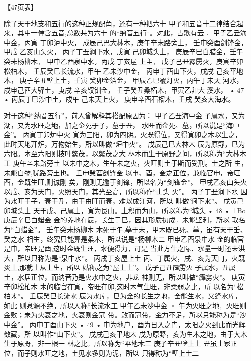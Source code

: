 【47页表】

除了天干地支和五行的这种正规配角，还有一种把六十
甲子和五音十二律结合起来，其中一律含五音,总数共为六十
的“纳音五行”。对此，古歌有云：
甲子乙丑海中金，丙寅 丁卯沪中火，
成辰己巴大林木，庚午辛未路旁土，
壬申癸酉剑锋金，甲戌 乙亥山头火，
丙子丁丑涧下水，戊寅 己卯城头土，
庚辰辛巳白腊金，壬午 癸未杨柳木，
甲申乙酉泉中水，丙戌 丁亥屋 上主，
戊子己丑霹雳火，庚寅辛卯松柏木，
壬辰癸巳长流水，甲午 乙未沙中金，
丙申丁酉山下火，戊戌 己亥平地木，
庚子辛丑壁上土，壬寅 癸卯金箔金，
甲辰乙巳覆灯火，丙午丁未天 河水，
戍申己酉大驿土，庚戌 辛亥钗钏金，
壬子癸丑桑柘木，甲寅乙卯大 溪水，
• 47 •
丙辰丁巳沙中土，戍午 己未天上火，
庚申辛酉石榴木，壬戌 癸亥大海水。

对于这种“纳音五行”，前人曾解释其搭配原因为：
甲子乙丑海中金
子属水，又为湖，又为水旺之地，加之金死于子，墓于丑，
水旺而金死、墓，所以说是“海中金”。
丙寅丁卯炉中火
寅为三阳，卯为四阴。火既得位，又得寅卯之木以生之，
此时天地开炉，万物始生，所以叫做“炉中火”。
戊辰己巳大林木
辰为原野，巳为六阳。木至六阳则枝叶繁茂，以繁茂之大
林木而生于原野之间，所以称为“大林木工
庚午辛未路旁土
以未中之木，生午未之火，火旺则土于斯而受刑。土之所
生，未能自物,犹路旁土也。
壬申癸酉剑锋金
以申、酉，金之正位，兼临官申，帝旺酉，金既生旺,则诚刚
矣，刚则无逾于剑锋，所以名为“剑锋金”。
甲戌乙亥山头火
以戌、亥为天门，火照天门，其光至高，所以称作“山头
火”。
丙子丁丑涧下水
因为水旺于子，衰于丑，由于由旺而衰，难以成江河，所以
叫做'涧下水”。
戊寅己卯城头土
天干戊、己属土，寅为艮山。土积而为山，所以称为“城头
• 48 •
±Bo
庚辰辛巳白蜡金
金的养地在辰，长生于巳，因其形质初成，未能坚利，所以
取名为“白蜡金”。
壬午癸未杨柳木
木死于午,墓于未，甲木既已死、墓，虽有天干壬、癸之水
相生，终究只能算是柔木，所以说是“杨柳木二
甲申乙酉泉中水
金的临官是申，帝旺是酉,这时金既生旺，水便得力，可是
当此方生之际，水量一时还未洪大，所以只称为是“泉中水”。
丙戌丁亥屋上土
丙、丁属火，戌、亥为天门，火既炎上,那就土从上生，所以
姑称之为“屋上土”。
戊子己丑霹雳火
子属水，丑属土，水居正位，而纳音乃是火水中之火，非龙
神则无，所以叫做“霹雳火”。
庚寅辛卯松柏木
木的临官在寅，帝旺在卯,这时木气生旺，非柔弱之比，所
以名为“松柏木”。
壬辰癸巳长流水
辰为水库，巳为金的长生之地，金能生水，又逢水库，如此
则泉源不绝，所以人称“长流水工
甲午乙未沙中金 ・
午为火旺之地，火旺则金败；未为火衰之地，火衰则金冠
带。败而冠带，金力不足，所以只能称为是“沙中金”。
丙申丁酉山下火
• 49 •
申为地户，酉为日入之门，太阳之火到此而光辉敛藏，所
以叫作“山下火”。
戊戌己亥平地木
戊为原野，亥为生木之地，由于大木生于原野，非一根一
林之比，所以称为“平地木工
庚子辛丑壁上土
丑虽土家正位，而子则水旺之地，土见水多则为泥，所以
只得称为“壁上土二
